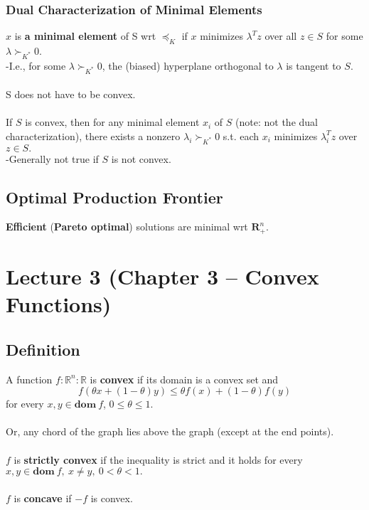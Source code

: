 \documentclass[]{article}
\begin{document}
\subsubsection*{Dual Characterization of Minimal Elements}
$x$ is \textbf{a minimal element} of S wrt $\preceq_{K}$ if $x$ minimizes $\lambda^{T}z$ over all $z \in S$ for some $\lambda \succ_{{K}^{*}} 0$. 
\\
-I.e., for some $\lambda \succ_{{K}^{*}} 0$, the (biased) hyperplane orthogonal to $\lambda$ is tangent to $S$. 
\\\\
S does not have to be convex.
\\\\
If $S$ is convex, then for any minimal element $x_{i}$ of $S$ (note: not the dual characterization), there exists a nonzero $\lambda_{i} \succ_{{K}^{*}} 0$ s.t. each $x_{i}$ minimizes $\lambda_{i}^{T}z$ over $z \in S.$
\\
-Generally not true if $S$ is not convex.
\\
\subsection*{Optimal Production Frontier}
\textbf{Efficient} (\textbf{Pareto optimal}) solutions are minimal wrt $\boldsymbol{R}^{n}_{+}$.\\

\section*{Lecture 3 (Chapter 3 -- Convex Functions)}
\subsection*{Definition}
A function $f:\mathbb{R}^{n} : \mathbb{R}$ is \textbf{convex} if its domain is a convex set and $$f(\theta x+(1-\theta)y) \leq \theta f(x) + (1-\theta) f(y)$$ for every $x,y \in \textbf{dom}\: f$, $0 \leq \theta \leq 1.$
\\\\
Or, any chord of the graph lies above the graph (except at the end points).
\\\\
$f$ is \textbf{strictly convex} if the inequality is strict and it holds for every $x,y \in \textbf{dom}\:f,\ x \neq y,\ 0 < \theta < 1.$
\\\\
$f$ is \textbf{concave} if $-f$ is convex.
\\
\end{document}
